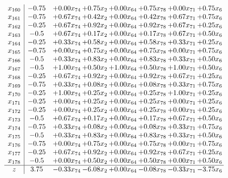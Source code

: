 \documentclass[8pt]{article}
\begin{document}
\[\begin{array}{c| c c@{\hskip 2pt} c@{\hskip 2pt} c@{\hskip 2pt} c@{\hskip 2pt} c@{\hskip 2pt} c@{\hskip 2pt} }
 x_{160}   &  -0.75 & +  0.00 x_{74} & +  0.75 x_{2} & +  0.00 x_{64} & +  0.75 x_{78} & +  0.00 x_{71} & +  0.75 x_{6}\\
 x_{161}   &  -0.75 & +  0.67 x_{74} & +  0.42 x_{2} & +  0.00 x_{64} & +  0.42 x_{78} & +  0.67 x_{71} & +  0.75 x_{6}\\
 x_{162}   &  -0.25 & +  0.67 x_{74} & +  0.92 x_{2} & +  0.00 x_{64} & +  0.92 x_{78} & +  0.67 x_{71} & +  0.25 x_{6}\\
 x_{163}   &  -0.5 & +  0.67 x_{74} & +  0.17 x_{2} & +  0.00 x_{64} & +  0.17 x_{78} & +  0.67 x_{71} & +  0.50 x_{6}\\
 x_{164}   &  -0.25 & +  0.33 x_{74} & +  0.58 x_{2} & +  0.00 x_{64} & +  0.58 x_{78} & +  0.33 x_{71} & +  0.25 x_{6}\\
 x_{165}   &  -0.75 & +  0.00 x_{74} & +  0.75 x_{2} & +  0.00 x_{64} & +  0.75 x_{78} & +  0.00 x_{71} & +  0.75 x_{6}\\
 x_{166}   &  -0.5 & +  0.33 x_{74} & +  0.83 x_{2} & +  0.00 x_{64} & +  0.83 x_{78} & +  0.33 x_{71} & +  0.50 x_{6}\\
 x_{167}   &  -0.5 & +  1.00 x_{74} & +  0.50 x_{2} & +  1.00 x_{64} & +  0.50 x_{78} & +  1.00 x_{71} & +  0.50 x_{6}\\
 x_{168}   &  -0.25 & +  0.67 x_{74} & +  0.92 x_{2} & +  0.00 x_{64} & +  0.92 x_{78} & +  0.67 x_{71} & +  0.25 x_{6}\\
 x_{169}   &  -0.75 & +  0.33 x_{74} & +  0.08 x_{2} & +  0.00 x_{64} & +  0.08 x_{78} & +  0.33 x_{71} & +  0.75 x_{6}\\
 x_{170}   &  -0.25 & +  1.00 x_{74} & +  0.25 x_{2} & +  0.00 x_{64} & +  0.25 x_{78} & +  1.00 x_{71} & +  0.25 x_{6}\\
 x_{171}   &  -0.25 & +  0.00 x_{74} & +  0.25 x_{2} & +  0.00 x_{64} & +  0.25 x_{78} & +  0.00 x_{71} & +  0.25 x_{6}\\
 x_{172}   &  -0.25 & +  0.00 x_{74} & +  0.25 x_{2} & +  0.00 x_{64} & +  0.25 x_{78} & +  0.00 x_{71} & +  0.25 x_{6}\\
 x_{173}   &  -0.5 & +  0.67 x_{74} & +  0.17 x_{2} & +  0.00 x_{64} & +  0.17 x_{78} & +  0.67 x_{71} & +  0.50 x_{6}\\
 x_{174}   &  -0.75 & +  0.33 x_{74} & +  0.08 x_{2} & +  0.00 x_{64} & +  0.08 x_{78} & +  0.33 x_{71} & +  0.75 x_{6}\\
 x_{175}   &  -0.5 & +  0.33 x_{74} & +  0.83 x_{2} & +  0.00 x_{64} & +  0.83 x_{78} & +  0.33 x_{71} & +  0.50 x_{6}\\
 x_{176}   &  -0.75 & +  0.00 x_{74} & +  0.75 x_{2} & +  0.00 x_{64} & +  0.75 x_{78} & +  0.00 x_{71} & +  0.75 x_{6}\\
 x_{177}   &  -0.25 & +  0.67 x_{74} & +  0.92 x_{2} & +  0.00 x_{64} & +  0.92 x_{78} & +  0.67 x_{71} & +  0.25 x_{6}\\
 x_{178}   &  -0.5 & +  0.00 x_{74} & +  0.50 x_{2} & +  0.00 x_{64} & +  0.50 x_{78} & +  0.00 x_{71} & +  0.50 x_{6}\\
\hline
z    &  3.75 & -0.33 x_{74} & -6.08 x_{2} & +  0.00 x_{64} & -0.08 x_{78} & -0.33 x_{71} & -3.75 x_{6}\\
\end{array}\]
\end{document}
